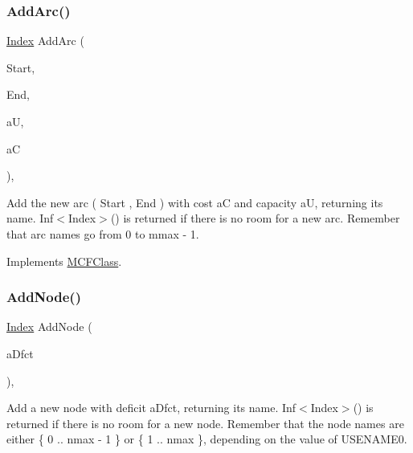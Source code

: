 \subsubsection{\texorpdfstring{Add\+Arc()}{AddArc()}}
{\footnotesize\ttfamily \mbox{\hyperlink{class_m_c_f_class_ad53d6229d7ec28555a9c9c2fd9abf773}{Index}} Add\+Arc (\begin{DoxyParamCaption}\item[{\mbox{\hyperlink{class_m_c_f_class_a76aaabb20535c51a2752b93f6c38fe54}{c\+Index}}}]{Start,  }\item[{\mbox{\hyperlink{class_m_c_f_class_a76aaabb20535c51a2752b93f6c38fe54}{c\+Index}}}]{End,  }\item[{\mbox{\hyperlink{class_m_c_f_class_a11f747fbdff346237c8db4469d569994}{c\+F\+Number}}}]{aU,  }\item[{\mbox{\hyperlink{class_m_c_f_class_a07dbefeeb08c3f63073622411893eb76}{c\+C\+Number}}}]{aC }\end{DoxyParamCaption})\hspace{0.3cm}{\ttfamily [override]}, {\ttfamily [virtual]}}

Add the new arc ( Start , End ) with cost aC and capacity aU, returning its name. Inf$<$\+Index$>$() is returned if there is no room for a new arc. Remember that arc names go from 0 to mmax -\/ 1. 

Implements \mbox{\hyperlink{class_m_c_f_class_a564d624f62ccc0c130d733cc5470cb6d}{M\+C\+F\+Class}}.

\mbox{\label{class_s_p_tree_a3b1944c7daf09b4e72cc2eeda39e335d}} 
\subsubsection{\texorpdfstring{Add\+Node()}{AddNode()}}
{\footnotesize\ttfamily \mbox{\hyperlink{class_m_c_f_class_ad53d6229d7ec28555a9c9c2fd9abf773}{Index}} Add\+Node (\begin{DoxyParamCaption}\item[{\mbox{\hyperlink{class_m_c_f_class_a11f747fbdff346237c8db4469d569994}{c\+F\+Number}}}]{a\+Dfct }\end{DoxyParamCaption})\hspace{0.3cm}{\ttfamily [override]}, {\ttfamily [virtual]}}

Add a new node with deficit a\+Dfct, returning its name. Inf$<$\+Index$>$() is returned if there is no room for a new node. Remember that the node names are either \{ 0 .. nmax -\/ 1 \} or \{ 1 .. nmax \}, depending on the value of U\+S\+E\+N\+A\+M\+E0. 


